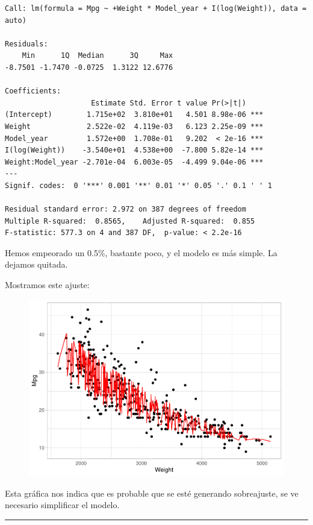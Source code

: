 \begin{verbatim}
Call: lm(formula = Mpg ~ +Weight * Model_year + I(log(Weight)), data = auto)

Residuals:
    Min      1Q  Median      3Q     Max 
-8.7501 -1.7470 -0.0725  1.3122 12.6776 

Coefficients:
                    Estimate Std. Error t value Pr(>|t|)    
(Intercept)        1.715e+02  3.810e+01   4.501 8.98e-06 ***
Weight             2.522e-02  4.119e-03   6.123 2.25e-09 ***
Model_year         1.572e+00  1.708e-01   9.202  < 2e-16 ***
I(log(Weight))    -3.540e+01  4.538e+00  -7.800 5.82e-14 ***
Weight:Model_year -2.701e-04  6.003e-05  -4.499 9.04e-06 ***
---
Signif. codes:  0 '***' 0.001 '**' 0.01 '*' 0.05 '.' 0.1 ' ' 1

Residual standard error: 2.972 on 387 degrees of freedom
Multiple R-squared:  0.8565,    Adjusted R-squared:  0.855 
F-statistic: 577.3 on 4 and 387 DF,  p-value: < 2.2e-16
\end{verbatim}

Hemos empeorado un 0.5\%, bastante poco, y el modelo es más simple. La dejamos quitada.

Mostramos este ajuste:
\begin{figure}[H]\includegraphics[width=.9\linewidth]{img/Regresion_files/figure-latex/unnamed-chunk-19-1} \caption{}\end{figure}

Esta gráfica nos indica que es probable que se esté generando sobreajuste, se ve necesario simplificar el modelo.

\begin{center}\rule{\linewidth}{0.5pt}\end{center}

